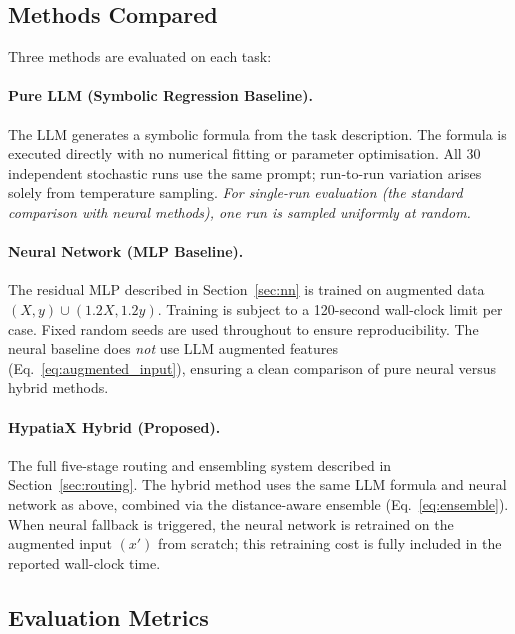 \documentclass[twoside,11pt]{article}
\begin{document}
\subsection{Methods Compared}\label{subsec:methods-compared}
\label{sec:setup_methods}

Three methods are evaluated on each task:

\paragraph{Pure LLM (Symbolic Regression Baseline).}
The LLM generates a symbolic formula from the task description.  The formula is
executed directly with no numerical fitting or parameter optimisation.  All 30
independent stochastic runs use the same prompt; run-to-run variation arises
solely from temperature sampling.  \emph{For single-run evaluation (the standard
comparison with neural methods), one run is sampled uniformly at random.}

\paragraph{Neural Network (MLP Baseline).}
The residual MLP described in Section~\ref{sec:nn} is trained on augmented data
$(X, y) \cup (1.2X, 1.2y)$.  Training is subject to a 120-second wall-clock
limit per case.  Fixed random seeds are used throughout to ensure reproducibility.
The neural baseline does \emph{not} use LLM augmented features (Eq.~\ref{eq:augmented_input}),
ensuring a clean comparison of pure neural versus hybrid methods.

\paragraph{HypatiaX Hybrid (Proposed).}
The full five-stage routing and ensembling system described in Section~\ref{sec:routing}.
The hybrid method uses the same LLM formula and neural network as above, combined via
the distance-aware ensemble (Eq.~\ref{eq:ensemble}).  When neural fallback is triggered,
the neural network is retrained on the augmented input $(x')$ from scratch; this
retraining cost is fully included in the reported wall-clock time.

\subsection{Evaluation Metrics}\label{subsec:evaluation-metrics}
\label{sec:setup_metrics}
\end{document}
